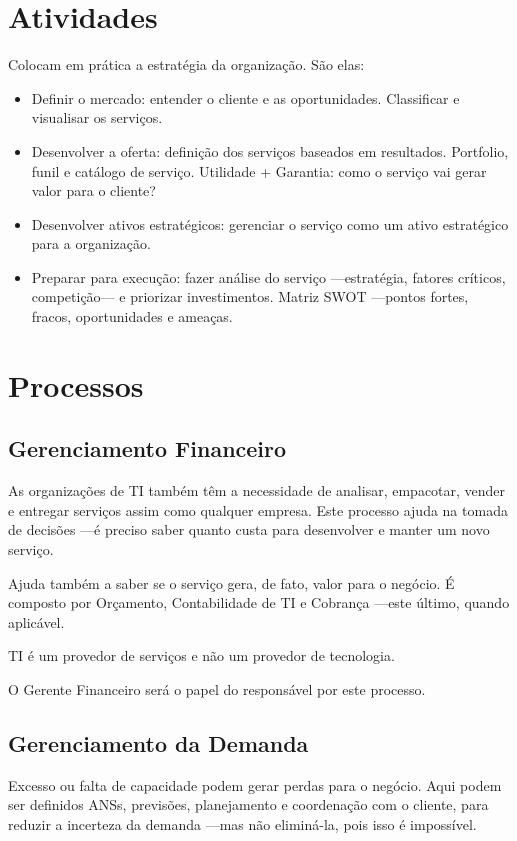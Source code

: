 \section{Atividades}
Colocam em prática a estratégia da organização. São elas:
\begin{itemize}
    \item Definir o mercado: entender o cliente e as oportunidades. Classificar
        e visualisar os serviços.
    \item Desenvolver a oferta: definição dos serviços baseados em resultados.
        Portfolio, funil e catálogo de serviço. Utilidade + Garantia: como o
        serviço vai gerar valor para o cliente?
    \item Desenvolver ativos estratégicos: gerenciar o serviço como um ativo
        estratégico para a organização.
    \item Preparar para execução: fazer análise do serviço ---estratégia,
        fatores críticos, competição--- e priorizar investimentos. Matriz SWOT
        ---pontos fortes, fracos, oportunidades e ameaças.
\end{itemize}


\section{Processos}
\subsection{Gerenciamento Financeiro}
As organizações de TI também têm a necessidade de analisar, empacotar, vender e
entregar serviços assim como qualquer empresa. Este processo ajuda na tomada de
decisões ---é preciso saber quanto custa para desenvolver e manter um novo
serviço.

Ajuda também a saber se o serviço gera, de fato, valor para o negócio. É
composto por Orçamento, Contabilidade de TI e Cobrança ---este último, quando
aplicável.

TI é um provedor de serviços e não um provedor de tecnologia.

O Gerente Financeiro será o papel do responsável por este processo.


\subsection{Gerenciamento da Demanda}
Excesso ou falta de capacidade podem gerar perdas para o negócio. Aqui podem
ser definidos ANSs, previsões, planejamento e coordenação com o cliente, para
reduzir a incerteza da demanda ---mas não eliminá-la, pois isso é impossível.

